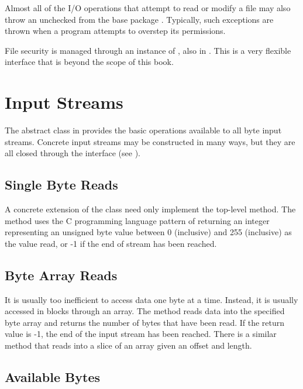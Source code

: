 Almost all of the I/O operations that attempt to read or modify a file
may also throw an unchecked  from the base
package . Typically, such exceptions are thrown when
a program attempts to overstep its permissions.

File security is managed through an instance of
, also in .  This is a very
flexible interface that is beyond the scope of this book.




\section{Input Streams}

The abstract class  in  provides the
basic operations available to all byte input streams.  Concrete
input streams may be constructed in many ways, but they are all closed
through the  interface (see ).

\subsection{Single Byte Reads}

A concrete extension of the  class need only
implement the top-level  method.  The 
method uses the C programming language pattern of returning an integer
representing an unsigned byte value between 0 (inclusive) and 255
(inclusive) as the value read, or -1 if the end of stream has been
reached.

\subsection{Byte Array Reads}

It is usually too inefficient to access data one byte at a time.
Instead, it is usually accessed in blocks through an array.  The
 method reads data into the specified byte array
and returns the number of bytes that have been read.  If the return
value is -1, the end of the input stream has been reached.  There is a
similar method that reads into a slice of an array given an offset
and length.

\subsection{Available Bytes}

